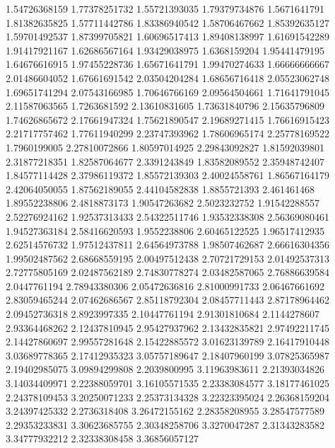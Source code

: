   1.54726368159    1.77378251732
  1.55721393035    1.79379734876
   1.5671641791    1.81382635825
  1.57711442786    1.83386940542
  1.58706467662    1.85392635127
  1.59701492537    1.87399705821
  1.60696517413    1.89408138997
  1.61691542289    1.91417921167
  1.62686567164    1.93429038975
   1.6368159204    1.95441479195
  1.64676616915    1.97455228736
  1.65671641791    1.99470274633
  1.66666666667    2.01486604052
  1.67661691542    2.03504204284
  1.68656716418    2.05523062748
  1.69651741294    2.07543166985
  1.70646766169    2.09564504661
  1.71641791045    2.11587063565
   1.7263681592    2.13610831605
  1.73631840796    2.15635796809
  1.74626865672    2.17661947324
  1.75621890547    2.19689271415
  1.76616915423    2.21717757462
  1.77611940299    2.23747393962
  1.78606965174    2.25778169522
   1.7960199005    2.27810072866
  1.80597014925    2.29843092827
  1.81592039801    2.31877218351
  1.82587064677     2.3391243849
  1.83582089552    2.35948742407
  1.84577114428    2.37986119372
  1.85572139303    2.40024558761
  1.86567164179    2.42064050055
  1.87562189055    2.44104582838
   1.8855721393      2.461461468
  1.89552238806     2.4818873173
  1.90547263682     2.5023232752
  1.91542288557    2.52276924162
  1.92537313433    2.54322511746
  1.93532338308    2.56369080461
  1.94527363184    2.58416620593
   1.9552238806    2.60465122525
  1.96517412935    2.62514576732
  1.97512437811    2.64564973788
  1.98507462687    2.66616304356
  1.99502487562    2.68668559195
  2.00497512438    2.70721729153
  2.01492537313    2.72775805169
  2.02487562189    2.74830778274
  2.03482587065    2.76886639584
   2.0447761194    2.78943380306
  2.05472636816    2.81000991733
  2.06467661692    2.83059465244
  2.07462686567    2.85118792304
  2.08457711443    2.87178964462
  2.09452736318     2.8923997335
  2.10447761194    2.91301810684
   2.1144278607    2.93364468262
  2.12437810945    2.95427937962
  2.13432835821    2.97492211745
  2.14427860697    2.99557281648
  2.15422885572    3.01623139789
  2.16417910448    3.03689778365
  2.17412935323    3.05757189647
  2.18407960199    3.07825365987
  2.19402985075    3.09894299808
   2.2039800995    3.11963983611
  2.21393034826    3.14034409971
  2.22388059701    3.16105571535
  2.23383084577    3.18177461025
  2.24378109453    3.20250071233
  2.25373134328    3.22323395024
  2.26368159204    3.24397425332
   2.2736318408    3.26472155162
  2.28358208955    3.28547577589
  2.29353233831    3.30623685755
  2.30348258706     3.3270047287
  2.31343283582    3.34777932212
  2.32338308458    3.36856057127
